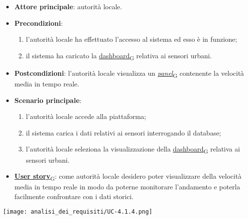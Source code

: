 \newpage
{}
\begin{itemize}
	\item \textbf{Attore principale}: autorità locale.
	\item \textbf{Precondizioni}:
	      \begin{enumerate}
		      \item l'autorità locale ha effettuato l'accesso al sistema ed esso è in funzione;
		      \item il sistema ha caricato la \href{https://7last.github.io/docs/pb/documentazione-interna/glossario\#dashboard}{dashboard\textsubscript{G}} relativa ai sensori urbani.
	      \end{enumerate}
	\item \textbf{Postcondizioni}: l'autorità locale visualizza un \href{https://7last.github.io/docs/pb/documentazione-interna/glossario\#panel}{\textit{panel}\textsubscript{G}} contenente la velocità media in tempo reale.
	\item \textbf{Scenario principale}:
	      \begin{enumerate}
		      \item l'autorità locale accede alla piattaforma;
		      \item il sistema carica i dati relativi ai sensori interrogando il database;
		      \item l'autorità locale seleziona la visualizzazione della \href{https://7last.github.io/docs/pb/documentazione-interna/glossario\#dashboard}{dashboard\textsubscript{G}} relativa ai sensori urbani.
	      \end{enumerate}
	\item \href{https://7last.github.io/docs/pb/documentazione-interna/glossario\#user-story}{\textbf{User story}\textsubscript{G}}:
	      come autorità locale desidero poter visualizzare della velocità media in tempo reale in modo da poterne monitorare l'andamento
	      e poterla facilmente confrontare con i dati storici.
\end{itemize}
\begin{center}
	\texttt{[image: analisi\_dei\_requisiti/UC-4.1.4.png]}
\end{center}

